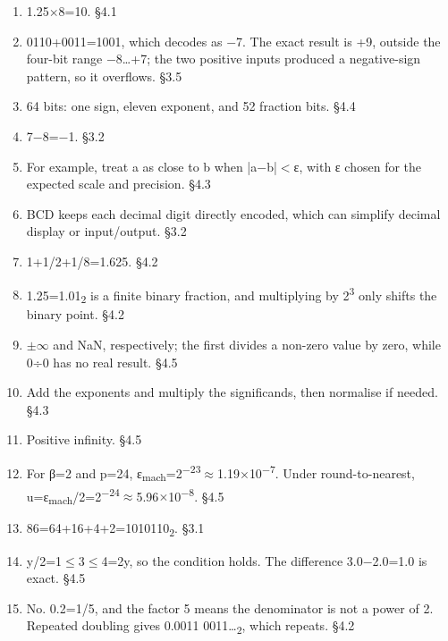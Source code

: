 \documentclass[11pt]{article}
\begin{document}
\begin{keepsection}
\begin{enumerate}
\item 1.25\ensuremath{\times}8=10. \hfill{\small\color{FAUblue}§4.1}
\item 0110+0011=1001, which decodes as \ensuremath{-}7. The exact result is +9, outside the four-bit range \ensuremath{-}8…+7; the two positive inputs produced a negative-sign pattern, so it overflows. \hfill{\small\color{FAUblue}§3.5}
\item 64 bits: one sign, eleven exponent, and 52 fraction bits. \hfill{\small\color{FAUblue}§4.4}
\item 7\ensuremath{-}8=\ensuremath{-}1. \hfill{\small\color{FAUblue}§3.2}
\item For example, treat a as close to b when |a\ensuremath{-}b|\ensuremath{<}ε, with ε chosen for the expected scale and precision. \hfill{\small\color{FAUblue}§4.3}
\item BCD keeps each decimal digit directly encoded, which can simplify decimal display or input/output. \hfill{\small\color{FAUblue}§3.2}
\item 1+1/2+1/8=1.625. \hfill{\small\color{FAUblue}§4.2}
\item 1.25=1.01\textsubscript{2} is a finite binary fraction, and multiplying by 2\textsuperscript{3} only shifts the binary point. \hfill{\small\color{FAUblue}§4.2}
\item \ensuremath{\pm}\ensuremath{\infty} and NaN, respectively; the first divides a non-zero value by zero, while 0÷0 has no real result. \hfill{\small\color{FAUblue}§4.5}
\item Add the exponents and multiply the significands, then normalise if needed. \hfill{\small\color{FAUblue}§4.3}
\item Positive infinity. \hfill{\small\color{FAUblue}§4.5}
\item For β=2 and p=24, ε\textsubscript{mach}=2\textsuperscript{\ensuremath{-}23}\ensuremath{\approx}1.19\ensuremath{\times}10\textsuperscript{\ensuremath{-}7}. Under round-to-nearest, u=ε\textsubscript{mach}/2=2\textsuperscript{\ensuremath{-}24}\ensuremath{\approx}5.96\ensuremath{\times}10\textsuperscript{\ensuremath{-}8}. \hfill{\small\color{FAUblue}§4.5}
\item 86=64+16+4+2=1010110\textsubscript{2}. \hfill{\small\color{FAUblue}§3.1}
\item y/2=1\ensuremath{\leq}3\ensuremath{\leq}4=2y, so the condition holds. The difference 3.0\ensuremath{-}2.0=1.0 is exact. \hfill{\small\color{FAUblue}§4.5}
\item No. 0.2=1/5, and the factor 5 means the denominator is not a power of 2. Repeated doubling gives 0.0011 0011…\textsubscript{2}, which repeats. \hfill{\small\color{FAUblue}§4.2}

\end{enumerate}
\end{keepsection}
\end{document}
